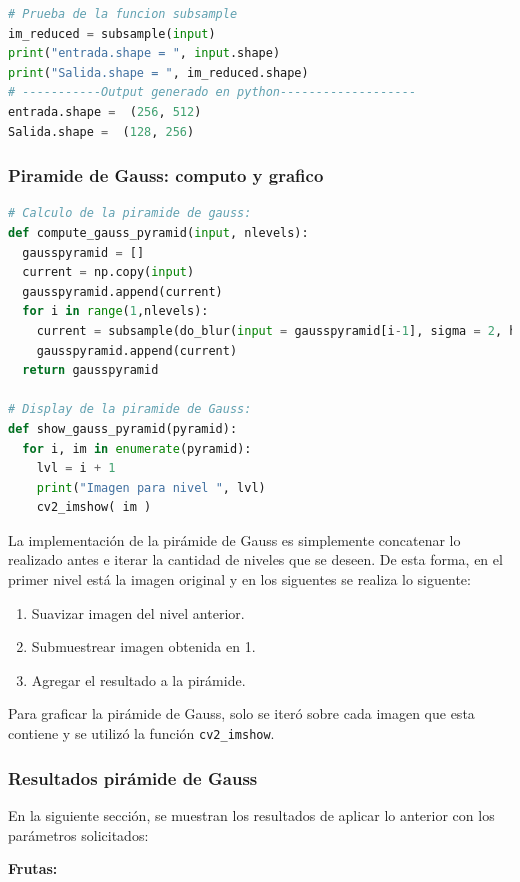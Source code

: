 \documentclass[12pt, letterpaper]{article}
\begin{document}
\begin{lstlisting}[language=Python, label = subsampletestCode, caption=Prueba del suavizado de imágenes.]
# Prueba de la funcion subsample
im_reduced = subsample(input)
print("entrada.shape = ", input.shape)
print("Salida.shape = ", im_reduced.shape)
# -----------Output generado en python-------------------
entrada.shape =  (256, 512)
Salida.shape =  (128, 256)
\end{lstlisting}


\subsubsection{Piramide de Gauss: computo y grafico}

\begin{lstlisting}[language=Python, label = gpCode, caption=Implementación pirámide de Gauss.]
# Calculo de la piramide de gauss:
def compute_gauss_pyramid(input, nlevels):  
  gausspyramid = []
  current = np.copy(input)
  gausspyramid.append(current)
  for i in range(1,nlevels):
    current = subsample(do_blur(input = gausspyramid[i-1], sigma = 2, height = 7))
    gausspyramid.append(current)
  return gausspyramid

# Display de la piramide de Gauss:
def show_gauss_pyramid(pyramid):
  for i, im in enumerate(pyramid):
    lvl = i + 1
    print("Imagen para nivel ", lvl)
    cv2_imshow( im )
\end{lstlisting}

\par La implementación de la pirámide de Gauss es simplemente concatenar lo realizado antes e iterar la cantidad de niveles que se deseen. De esta forma, en el primer nivel está la imagen original y en los siguentes se realiza lo siguente:

\begin{enumerate}
  \item Suavizar imagen del nivel anterior. 
  \item Submuestrear imagen obtenida en 1. 
  \item Agregar el resultado a la pirámide.
\end{enumerate}

\par Para graficar la pirámide de Gauss, solo se iteró sobre cada imagen que esta contiene y se utilizó la función \texttt{cv2\_imshow}.

\subsubsection{Resultados pirámide de Gauss}
\par En la siguiente sección, se muestran los resultados de aplicar lo anterior con los parámetros solicitados: 
\par \textbf{Frutas:}
\end{document}
